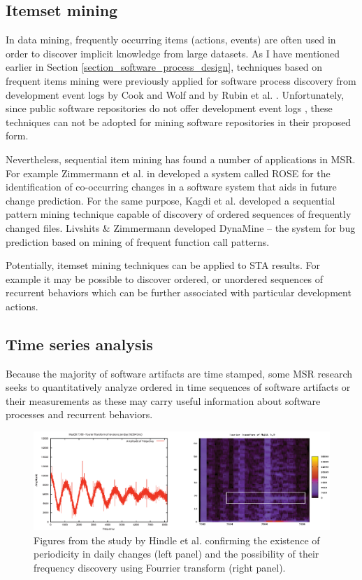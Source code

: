 \subsection{Itemset mining}
In data mining, frequently occurring items (actions, events) are often used in order to discover implicit knowledge from
large datasets. As I have mentioned earlier in Section \ref{section_software_process_design}, techniques based on frequent
items mining were previously applied for software process discovery from development event logs 
by Cook and Wolf \cite{citeulike:328044} \cite{citeulike:5120757} \cite{citeulike:5128143} 
and by Rubin et al. \cite{citeulike:1885717}. Unfortunately, since public software repositories do not offer 
development event logs \cite{citeulike:1296888}, these techniques can not be adopted for mining software 
repositories in their proposed form.

Nevertheless, sequential item mining has found a number of applications in MSR.
For example Zimmermann et al. in \cite{citeulike:277045} developed a system called ROSE for the identification of 
co-occurring changes in a software system that aids in future change prediction. 
For the same purpose, Kagdi et al. \cite{citeulike:3929070} developed a sequential pattern mining technique capable of 
discovery of ordered sequences of frequently changed files. 
Livshits \& Zimmermann \cite{citeulike:393158} developed DynaMine -- the system for bug prediction based on mining 
of frequent function call patterns.

Potentially, itemset mining  techniques can be applied to STA results. For example it may be possible to discover ordered, or
unordered sequences of recurrent behaviors which can be further associated with particular development actions.

\subsection{Time series analysis}\label{chapter2_section-tsanalysis}
Because the majority of software artifacts are time stamped, some MSR research seeks to quantitatively analyze ordered 
in time sequences of software artifacts or their measurements as these may carry useful information about software 
processes and recurrent behaviors. 

\begin{figure}[t!]
   \centering
   \includegraphics[width=145mm]{figures/FourrierMySQL.eps}
   \caption{Figures from the study by Hindle et al. \cite{citeulike:10377345} confirming the existence of periodicity
   in daily changes (left panel) and the possibility of their frequency discovery using Fourrier transform (right panel).   
   }
   \label{fig:mysql-fourrier}
\end{figure}

